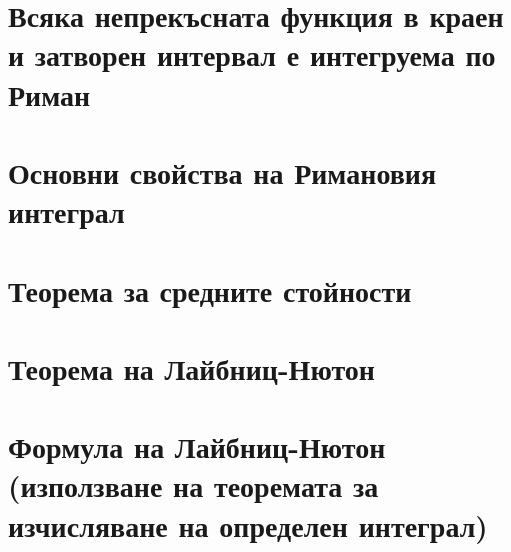 \documentclass[fleqn,12pt]{article}
\begin{document}
\begin{flushleft}
\section{Всяка непрекъсната функция в краен и затворен интервал е интегруема по Риман}
\section{Основни свойства на Римановия интеграл}
\section{Теорема за средните стойности}
\section{Теорема на Лайбниц-Нютон}
\section{Формула на Лайбниц-Нютон (използване на теоремата за изчисляване на определен интеграл)}


\end{flushleft}
\end{document}
